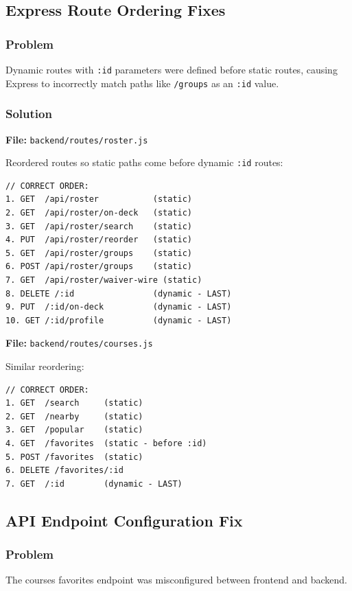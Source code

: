 \documentclass[11pt,a4paper]{article}
\begin{document}
\subsection{Express Route Ordering Fixes}

\subsubsection{Problem}
Dynamic routes with \texttt{:id} parameters were defined before static routes, causing Express to incorrectly match paths like \texttt{/groups} as an \texttt{:id} value.

\subsubsection{Solution}

\textbf{File:} \texttt{backend/routes/roster.js}

Reordered routes so static paths come before dynamic \texttt{:id} routes:
\begin{lstlisting}
// CORRECT ORDER:
1. GET  /api/roster           (static)
2. GET  /api/roster/on-deck   (static)
3. GET  /api/roster/search    (static)
4. PUT  /api/roster/reorder   (static)
5. GET  /api/roster/groups    (static)
6. POST /api/roster/groups    (static)
7. GET  /api/roster/waiver-wire (static)
8. DELETE /:id                (dynamic - LAST)
9. PUT  /:id/on-deck          (dynamic - LAST)
10. GET /:id/profile          (dynamic - LAST)
\end{lstlisting}

\textbf{File:} \texttt{backend/routes/courses.js}

Similar reordering:
\begin{lstlisting}
// CORRECT ORDER:
1. GET  /search     (static)
2. GET  /nearby     (static)
3. GET  /popular    (static)
4. GET  /favorites  (static - before :id)
5. POST /favorites  (static)
6. DELETE /favorites/:id
7. GET  /:id        (dynamic - LAST)
\end{lstlisting}

\subsection{API Endpoint Configuration Fix}

\subsubsection{Problem}
The courses favorites endpoint was misconfigured between frontend and backend.
\end{document}
